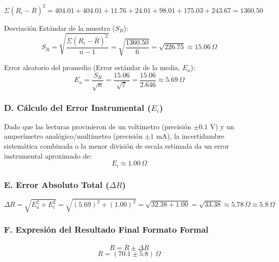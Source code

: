 \documentclass[12pt,a4paper]{article}
\begin{document}
\begin{equation}
\Sigma(R_i - \overline{R})^2 = 404.01 + 404.01 + 11.76 + 24.01 + 98.01 + 175.03 + 243.67 = 1360.50
\end{equation}

Desviación Estándar de la muestra ($S_R$):
\begin{equation}
S_R = \sqrt{\frac{\Sigma(R_i - \overline{R})^2}{n-1}} = \sqrt{\frac{1360.50}{6}} = \sqrt{226.75} \approx 15.06\,\Omega
\end{equation}

Error aleatorio del promedio (Error estándar de la media, $E_a$):
\begin{equation}
E_a = \frac{S_R}{\sqrt{n}} = \frac{15.06}{\sqrt{7}} = \frac{15.06}{2.646} \approx 5.69\,\Omega
\end{equation}

\subsubsection*{D. Cálculo del Error Instrumental ($E_i$)}
Dado que las lecturas provinieron de un voltímetro (precisión $\pm 0.1\text{ V}$) y un amperímetro analógico/multímetro (precisión $\pm 1\text{ mA}$), la incertidumbre sistemática combinada o la menor división de escala estimada da un error instrumental aproximado de:
\begin{equation}
E_i \approx 1.00\,\Omega
\end{equation}

\subsubsection*{E. Error Absoluto Total ($\Delta R$)}
\begin{equation}
\Delta R = \sqrt{E_a^2 + E_i^2} = \sqrt{(5.69)^2 + (1.00)^2} = \sqrt{32.38 + 1.00} = \sqrt{33.38} \approx 5.78\,\Omega \approx 5.8\,\Omega
\end{equation}

\subsubsection*{F. Expresión del Resultado Final Formato Formal}
\begin{equation}
R = \overline{R} \pm \Delta R
\end{equation}
\begin{equation}
R = (70.1 \pm 5.8)\,\Omega
\end{equation}
\end{document}
